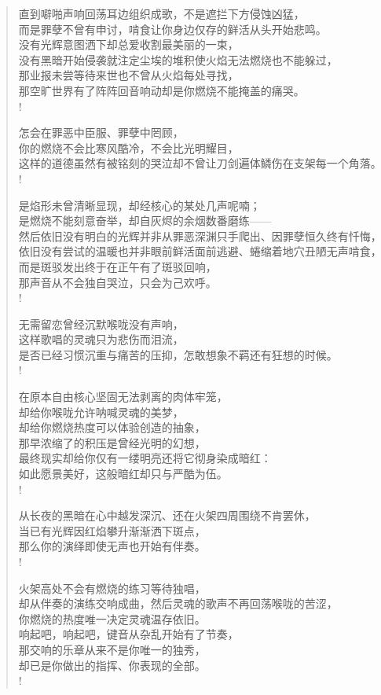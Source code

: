 \documentclass[UTF8, 12pt, a4paper]{ctexrep} %
\begin{document}
\begin{verse}
直到噼啪声响回荡耳边组织成歌，不是遮拦下方侵蚀凶猛，\\
而是罪孽不曾有申讨，啃食让你身边仅存的鲜活从头开始悲鸣。\\
没有光辉意图洒下却总爱收割最美丽的一束，\\
没有黑暗开始侵袭就注定尘埃的堆积使火焰无法燃烧也不能躲过，\\
那业报未尝等待来世也不曾从火焰每处寻找，\\
那空旷世界有了阵阵回音响动却是你燃烧不能掩盖的痛哭。\\!

怎会在罪恶中臣服、罪孽中罔顾，\\
你的燃烧不会比寒风酷冷，不会比光明耀目，\\
这样的道德虽然有被铭刻的哭泣却不曾让刀剑遍体鳞伤在支架每一个角落。\\!

是焰形未曾清晰显现，却经核心的某处几声呢喃；\\
是燃烧不能刻意奋举，却自灰烬的余烟数番磨练——\\
然后依旧没有明白的光辉并非从罪恶深渊只手爬出、因罪孽恒久终有忏悔，\\
依旧没有尝试的温暖也并非眼前鲜活面前逃避、蜷缩着地穴丑陋无声啃食，\\
而是斑驳发出终于在正午有了斑驳回响，\\
那声音从不会独自哭泣，只会为己欢呼。\\!

无需留恋曾经沉默喉咙没有声响，\\
这样歌唱的灵魂只为悲伤而泪流，\\
是否已经习惯沉重与痛苦的压抑，怎敢想象不羁还有狂想的时候。\\!

在原本自由核心坚固无法剥离的肉体牢笼，\\
却给你喉咙允许呐喊灵魂的美梦，\\
却给你燃烧热度可以体验创造的抽象，\\
那早浓缩了的积压是曾经光明的幻想，\\
最终现实却给你仅有一缕明亮还将它彻身染成暗红：\\
如此愿景美好，这般暗红却只与严酷为伍。\\!

从长夜的黑暗在心中越发深沉、还在火架四周围绕不肯罢休，\\
当已有光辉因红焰攀升渐渐洒下斑点，\\
那么你的演绎即使无声也开始有伴奏。\\!

火架高处不会有燃烧的练习等待独唱，\\
却从伴奏的演练交响成曲，然后灵魂的歌声不再回荡喉咙的苦涩，\\
你燃烧的热度唯一决定灵魂温存依旧。\\
响起吧，响起吧，键音从杂乱开始有了节奏，\\
那交响的乐章从来不是你唯一的独秀，\\
却已是你做出的指挥、你表现的全部。\\!


\end{verse}
\end{document}
